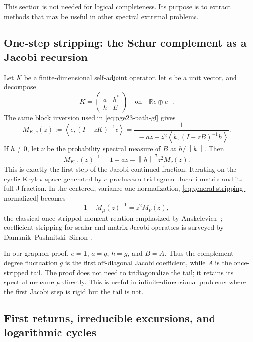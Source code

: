 \documentclass[11pt]{article}
\numberwithin{equation}{section}
\newcommand{\one}{\mathbf 1}
\newcommand{\R}{\mathbb R}
\newcommand{\ip}[2]{\left\langle #1,#2\right\rangle}
\newcommand{\norm}[1]{\left\lVert #1\right\rVert}
\begin{document}
This section is not needed for logical completeness.  Its purpose is to
extract methods that may be useful in other spectral extremal problems.

\subsection{One-step stripping: the Schur complement as a Jacobi recursion}

Let $K$ be a finite-dimensional self-adjoint operator, let $e$ be a unit
vector, and decompose
\[
  K=\begin{pmatrix}a&h^*\\h&B\end{pmatrix}
  \quad\text{on}\quad \R e\oplus e^\perp.
\]
The same block inversion used in \eqref{eq:pge23-path-gf} gives
\begin{equation}\label{eq:general-stripping}
  M_{K,e}(z):=\ip e{(I-zK)^{-1}e}
  =\frac{1}{1-az-z^2\ip h{(I-zB)^{-1}h}}.
\end{equation}
If $h\ne0$, let $\nu$ be the probability spectral measure of $B$ at
$h/\norm h$.  Then
\begin{equation}\label{eq:general-stripping-normalized}
  M_{K,e}(z)^{-1}
  =1-az-\norm h^2z^2M_\nu(z).
\end{equation}
This is exactly the first step of the Jacobi continued fraction.  Iterating
on the cyclic Krylov space generated by $e$ produces a tridiagonal Jacobi
matrix and its full J-fraction.  In the centered, variance-one normalization,
\eqref{eq:general-stripping-normalized} becomes
\[
  1-M_\mu(z)^{-1}=z^2M_\nu(z),
\]
the classical once-stripped moment relation emphasized by
Anshelevich~\cite{Anshelevich2009}; coefficient stripping for scalar and
matrix Jacobi operators is surveyed by Damanik--Pushnitski--Simon
\cite{DamanikPushnitskiSimon2008}.

In our graphon proof, $e=\one$, $a=q$, $h=g$, and $B=A$.  Thus the
complement degree fluctuation $g$ is the first off-diagonal Jacobi
coefficient, while $A$ is the once-stripped tail.  The proof does not need
to tridiagonalize the tail; it retains its spectral measure $\mu$ directly.
This is useful in infinite-dimensional problems where the first Jacobi step
is rigid but the tail is not.

\subsection{First returns, irreducible excursions, and logarithmic cycles}
\end{document}
